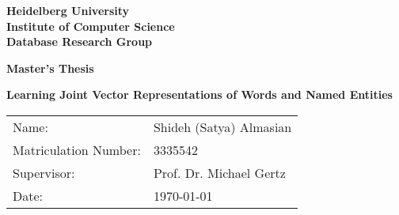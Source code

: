\begin{titlepage}
  
\vspace*{1cm}
\begin{center}
\vspace*{3cm}
\textbf{ 
\Large Heidelberg University\\
\smallskip
\Large Institute of Computer Science \\
\smallskip
\Large Database Research Group\\
\smallskip
}

\vspace{3cm}

\textbf{\large Master's Thesis } %

\vspace{0.5\baselineskip}
{\huge
\textbf{Learning Joint Vector Representations of Words and Named Entities}
}
\end{center}

\vfill 

{\large
\begin{tabular}[l]{ll}
Name: & Shideh (Satya) Almasian \\
Matriculation Number: & 3335542\\
Supervisor: & Prof. Dr. Michael Gertz\\
Date: & \today
\end{tabular}
}

\end{titlepage}

\newpage
\null
\thispagestyle{empty}
\newpage
